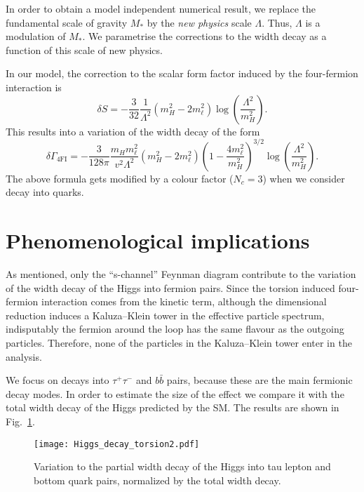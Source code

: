 \documentclass{ws-mpla}
\renewcommand{\(}{\left(}
\renewcommand{\)}{\right)}
\renewcommand{\[}{\left[}
\renewcommand{\]}{\right]}
\begin{document}
In order to obtain a model independent numerical result, we replace the fundamental scale of gravity $M_*$ by the \emph{new physics} scale $\Lambda$. Thus, $\Lambda$ is a modulation of $M_*$.
We parametrise the corrections to the width decay as a function of this scale of new physics.

In our model, the correction to the scalar form factor induced by the four-fermion interaction is
\begin{equation}
  \delta S = - \frac{3}{32} \frac{1}{\Lambda^2} \( m_H^2 - 2 m_\ell^2 \) \log\( \frac{\Lambda^2}{m_H^2} \).
  \label{Sform}
\end{equation}
This results into a variation of the width decay  of the form
\begin{equation}
  \delta \Gamma_{\text{4FI}} = -\frac{3}{128 \pi} \frac{ m_H m_\ell^2}{v^2 \Lambda^2} \( m_H^2 - 2 m_\ell^2 \) \( 1 - \frac{4 m_\ell^2}{m_H^2} \)^{3/2} \log\( \frac{\Lambda^2}{m_H^2} \) .
\end{equation}
The above formula gets modified by a colour factor ($N_c = 3$) when we consider decay into quarks.


\section{Phenomenological implications}\label{phenom}

As mentioned, only the ``s-channel'' Feynman diagram contribute to the variation of the width decay of the Higgs into fermion pairs. Since the torsion induced four-fermion interaction comes from the kinetic term, although the dimensional reduction induces a Kaluza--Klein tower in the effective particle spectrum, indisputably the fermion around the loop has the same flavour as the outgoing particles. Therefore, none of the particles in the Kaluza--Klein tower enter in the analysis.

We focus on decays into $\tau^+ \tau^-$ and $b \bar{b}$ pairs, because these are the main fermionic decay modes. In order to estimate the size of the effect we compare it with the total width decay of the Higgs predicted by the SM. The results are shown in Fig.~\ref{fig:Hdt}.
\begin{figure}[hbt]
  \begin{center}
    \texttt{[image: Higgs\_decay\_torsion2.pdf]} 
  \end{center}
  \caption{Variation to the partial width decay of the Higgs into tau lepton and bottom quark pairs, normalized by the total width decay.}
  \label{fig:Hdt}
\end{figure}
\end{document}

